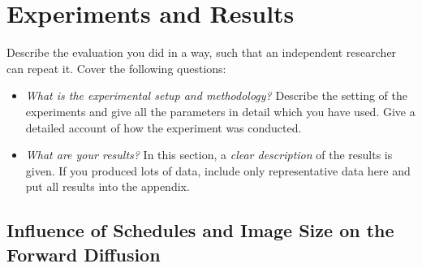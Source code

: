 %
\newpage
\chapter{Experiments and Results}
Describe the evaluation you did in a way, such that an independent researcher can repeat it. Cover the following questions:
\begin{itemize}
    \item \textit{What is the experimental setup and methodology?} Describe the setting of the experiments and give all the parameters in detail which you have used. Give a detailed account of how the experiment was conducted.
    \item \textit{What are your results?} In this section, a \emph{clear description} of the results is given. If you produced lots of data, include only representative data here and put all results into the appendix.
\end{itemize}

\section{Influence of Schedules and Image Size on the Forward Diffusion}
\label{sec:forward_diff_experiments}